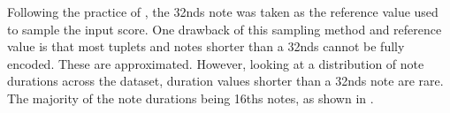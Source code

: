 
Following the practice of \textcite{micchi2020not}, the
\glspl{32nd} note was taken as the reference value used to
sample the input score. One drawback of this sampling method
and reference value is that most tuplets and notes shorter
than a \glspl{32nd} cannot be fully encoded. These are
approximated. However, looking at a distribution of note
durations across the dataset, duration values shorter than a
\glspl{32nd} note are rare. The majority of the note
durations being \glspl{16th} notes, as shown in
. 

